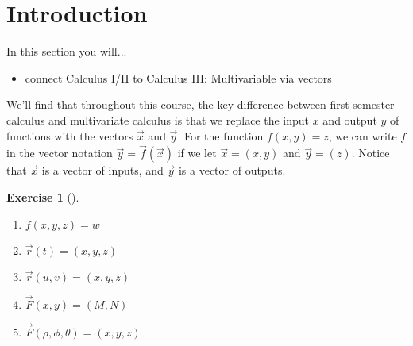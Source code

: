 \documentclass[10pt,]{book}
\theoremstyle{plain}
\theoremstyle{definition}
\theoremstyle{definition}
\theoremstyle{definition}
\theoremstyle{definition}
\newtheorem{exploration}[project]{Exercise}
\theoremstyle{definition}
\numberwithin{equation}{section}
\begin{document}
\section[{Introduction}]{Introduction}\label{section-20}
In this section you will... \leavevmode%
\begin{itemize}[label=\textbullet]
\item{}connect Calculus I/II to Calculus III: Multivariable via vectors%
\end{itemize}
%
\par
We'll find that throughout this course, the key difference between first-semester calculus and multivariate calculus is that we replace the input \(x\) and output \(y\) of functions with the vectors \(\vec x\) and \(\vec y\). For the function \(f(x,y)=z\), we can write \(f\) in the vector notation \(\vec y=\vec f(\vec x)\) if we let \(\vec x=(x,y)\) and \(\vec y=(z)\). Notice that \(\vec x\) is a vector of inputs, and \(\vec y\) is a vector of outputs.%
\begin{exploration}[]\label{exploration-131}
\leavevmode%
\begin{enumerate}[font=\bfseries,label=(\alph*),ref=\alph*]
\item\label{task-258} \(f(x,y,z)=w\)%
\item\label{task-259} \(\vec r(t)=(x,y,z)\)%
\item\label{task-260} \(\vec r(u,v)=(x,y,z)\)%
\item\label{task-261} \(\vec F(x,y)=(M,N)\)%
\item\label{task-262} \(\vec F(\rho,\phi,\theta)=(x,y,z)\)%
\end{enumerate}
\end{exploration}
\typeout{************************************************}
\typeout{************************************************}
\end{document}
